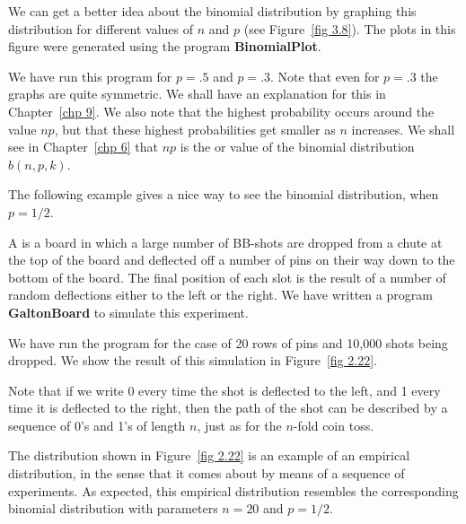 We can get a better idea about the binomial distribution by graphing this distribution
for different values of $n$ and $p$ (see Figure~\ref{fig 3.8}).  The plots in this figure
were generated using the program {\bf BinomialPlot}.


\par We have run this program for $p = .5$ and $p = .3$.  Note that even for $p = .3$
the graphs are quite symmetric.  We shall have an explanation for this in
Chapter~\ref{chp 9}.   We also note that the highest probability occurs around the
value $np$, but that these highest probabilities get smaller as $n$ increases.  We
shall see in Chapter~\ref{chp 6}  that $np$ is the  or 
value of the binomial distribution  $b(n,p,k)$.
\par
The following example gives a nice way to see the binomial distribution, when $p =
1/2$.
\begin{example}\label{exam 3.2.1}
A  is a board in which a large number of BB-shots are
dropped from a chute at the top of the board and deflected off a number of pins
on their way down to the bottom of the board.  The final position of each slot
is the result of a number of random deflections either to the left or the
right.  We have written a program {\bf GaltonBoard} to simulate this
experiment.
\par
We have run the program for the case of 20 rows of pins and 10{,}000 shots being
dropped.  We show the result of this simulation in Figure~\ref{fig 2.22}. 
\par
{} 

Note that if we write 0 every time the shot is deflected to the left, and 1
every time it is deflected to the right, then the path of the shot can be
described by a sequence of 0's and 1's of length $n$, just as for the $n$-fold
coin toss.
\par
The distribution shown in Figure~\ref{fig 2.22} is an example of an empirical
distribution, in the sense that it comes about by means of a sequence of
experiments.  As expected, this empirical distribution resembles the corresponding
binomial distribution with parameters $n = 20$ and $p = 1/2$. 
\end{example}



